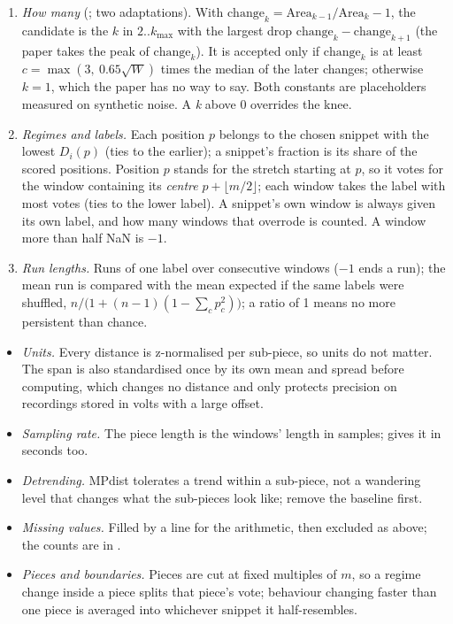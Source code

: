 \begin{enumerate}
  $k = 1, 2, \dots, k_{\max}+1$ pick the usable piece minimising $\sum_p \min(D_i(p), Q(p))$, record
  that sum as $\mathrm{Area}_k$, and set $Q \gets \min(Q, D_i)$.
\item \emph{How many} (; two adaptations). With
  $\mathrm{change}_k = \mathrm{Area}_{k-1}/\mathrm{Area}_k - 1$, the candidate is the $k$ in
  $2..k_{\max}$ with the largest drop $\mathrm{change}_k - \mathrm{change}_{k+1}$ (the paper takes
  the peak of $\mathrm{change}_k$). It is accepted only if $\mathrm{change}_k$ is at least
  $c = \max(3,\ 0.65\sqrt{W})$ times the median of the later changes; otherwise $k = 1$, which the
  paper has no way to say. Both constants are placeholders measured on synthetic noise. A \emph{k}
  above 0 overrides the knee.
\item \emph{Regimes and labels.} Each position $p$ belongs to the chosen snippet with the lowest
  $D_i(p)$ (ties to the earlier); a snippet's fraction is its share of the scored positions.
  Position $p$ stands for the stretch starting at $p$, so it votes for the window containing its
  \emph{centre} $p + \lfloor m/2\rfloor$; each window takes the label with most votes (ties to the
  lower label). A snippet's own window is always given its own label, and how many windows that
  overrode is counted. A window more than half NaN is $-1$.
\item \emph{Run lengths.} Runs of one label over consecutive windows ($-1$ ends a run); the mean
  run is compared with the mean expected if the same labels were shuffled,
  $n / \bigl(1 + (n-1)(1 - \sum_c p_c^2)\bigr)$; a ratio of 1 means no more persistent than chance.
\end{enumerate}

\begin{itemize}
\item \emph{Units.} Every distance is z-normalised per sub-piece, so units do not matter. The span
  is also standardised once by its own mean and spread before computing, which changes no distance
  and only protects precision on recordings stored in volts with a large offset.
\item \emph{Sampling rate.} The piece length is the windows' length in samples;  gives it
  in seconds too.
\item \emph{Detrending.} MPdist tolerates a trend within a sub-piece, not a wandering level that
  changes what the sub-pieces look like; remove the baseline first.
\item \emph{Missing values.} Filled by a line for the arithmetic, then excluded as above; the
  counts are in .
\item \emph{Pieces and boundaries.} Pieces are cut at fixed multiples of $m$, so a regime change
  inside a piece splits that piece's vote; behaviour changing faster than one piece is averaged into
  whichever snippet it half-resembles.
\end{itemize}

